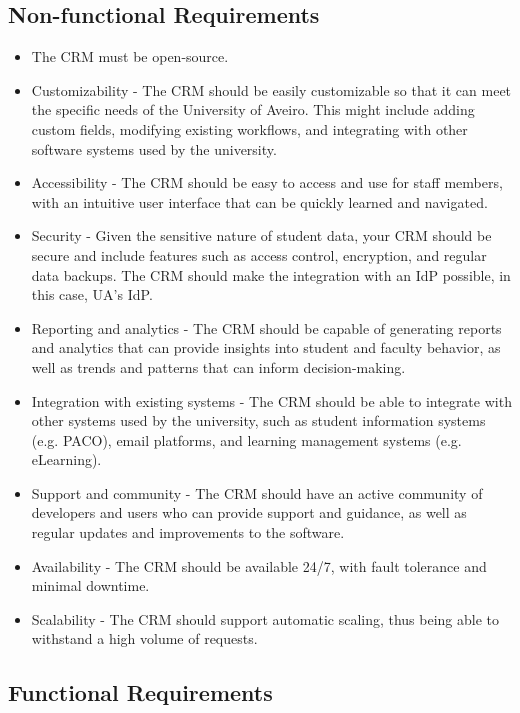 \documentclass{article}
\begin{document}
\subsection{Non-functional Requirements}

\begin{itemize}

    \item The CRM must be open-source.
    \item Customizability - The CRM should be easily customizable so that it can meet the specific needs of the University of Aveiro. This might include adding custom fields, modifying existing workflows, and integrating with other software systems used by the university.
    \item Accessibility - The CRM should be easy to access and use for staff members, with an intuitive user interface that can be quickly learned and navigated.
    \item Security - Given the sensitive nature of student data, your CRM should be secure and include features such as access control, encryption, and regular data backups. The CRM should make the integration with an IdP possible, in this case, UA's IdP.
    \item Reporting and analytics - The CRM should be capable of generating reports and analytics that can provide insights into student and faculty behavior, as well as trends and patterns that can inform decision-making.
    \item Integration with existing systems - The CRM should be able to integrate with other systems used by the university, such as student information systems (e.g. PACO), email platforms, and learning management systems (e.g. eLearning).
    \item Support and community - The CRM should have an active community of developers and users who can provide support and guidance, as well as regular updates and improvements to the software.
    \item Availability - The CRM should be available 24/7, with fault tolerance and minimal downtime.
    \item Scalability - The CRM should support automatic scaling, thus being able to withstand a high volume of requests.

\end{itemize}

\subsection{Functional Requirements}
\end{document}
